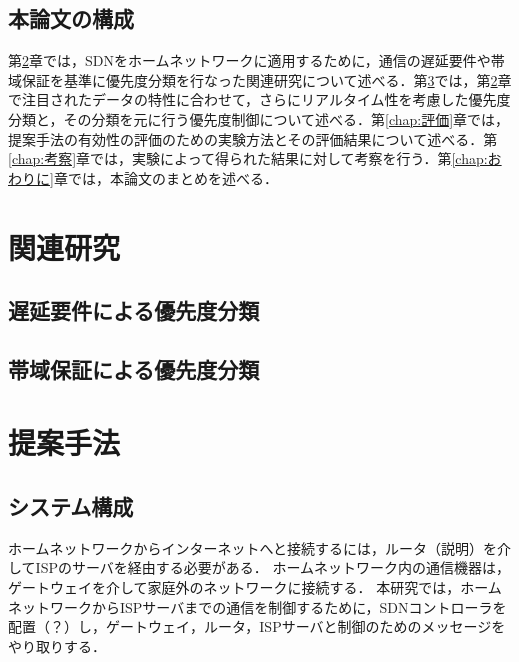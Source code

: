 \documentclass[a4paper,11pt,uplatex]{ujreport}
\begin{document}
\section{本論文の構成}
\label{sec:本論文の構成}

  第\ref{chap:関連研究}章では，SDNをホームネットワークに適用するために，通信の遅延要件や帯域保証を基準に優先度分類を行なった関連研究について述べる．第\ref{chap:提案手法}では，第\ref{chap:関連研究}章で注目されたデータの特性に合わせて，さらにリアルタイム性を考慮した優先度分類と，その分類を元に行う優先度制御について述べる．第\ref{chap:評価}章では，提案手法の有効性の評価のための実験方法とその評価結果について述べる．第\ref{chap:考察}章では，実験によって得られた結果に対して考察を行う．第\ref{chap:おわりに}章では，本論文のまとめを述べる．


\chapter{関連研究}
\label{chap:関連研究}

\section{遅延要件による優先度分類}
\label{sec:遅延要件による優先度分類}

\section{帯域保証による優先度分類}
\label{sec:帯域保証による優先度分類}

\chapter{提案手法}
\label{chap:提案手法}

\section{システム構成}
\label{sec:システム構成}

  ホームネットワークからインターネットへと接続するには，ルータ（説明）を介してISPのサーバを経由する必要がある．
  ホームネットワーク内の通信機器は，ゲートウェイを介して家庭外のネットワークに接続する．
  本研究では，ホームネットワークからISPサーバまでの通信を制御するために，SDNコントローラを配置（？）し，ゲートウェイ，ルータ，ISPサーバと制御のためのメッセージをやり取りする．
\end{document}
